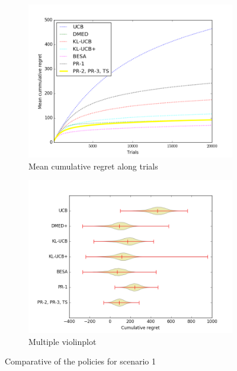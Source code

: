\begin{figure}[!htb]
    \centering
    \begin{subfigure}[b]{0.5\textwidth}
        \includegraphics[width=\textwidth]{recursos/Figure1a}
        \caption{Mean cumulative regret along trials}
        \label{fig:Bernoulli1_semilog}
    \end{subfigure}
    \begin{subfigure}[b]{0.5\textwidth}
        \includegraphics[width=\textwidth]{recursos/Figure1b}
        \caption{Multiple violinplot}
        \label{fig:Bernoulli1_boxplot}
    \end{subfigure}
    \caption{Comparative of the policies for scenario 1}
    \label{fig:Bernoulli1}
\end{figure}


